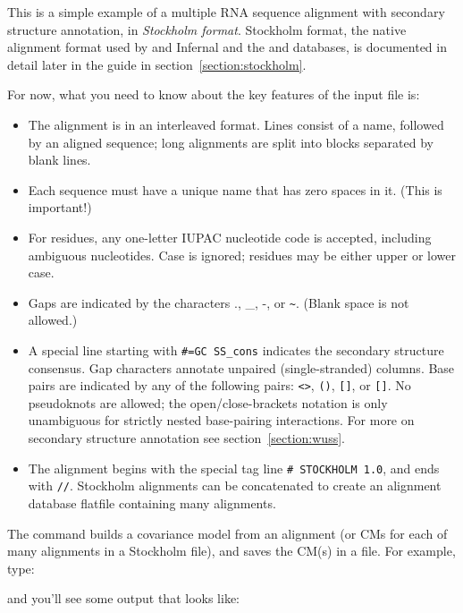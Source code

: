 This is a simple example of a multiple RNA sequence alignment with
secondary structure annotation, in \emph{Stockholm format}. Stockholm
format, the native alignment format used by  and
Infernal and the  and  databases, is
documented in detail later in the guide in
section~\ref{section:stockholm}.

For now, what you need to know about the key features of the input file is:
\begin{itemize}
\item The alignment is in an interleaved format.
Lines consist of a name, followed by an aligned sequence;
long alignments are split into blocks separated by blank lines.
\item Each sequence must have a unique name that has zero spaces in it. (This is important!)
\item For residues, any one-letter IUPAC nucleotide code is accepted,
      including ambiguous nucleotides. Case is ignored; residues
      may be either upper or lower case.
\item Gaps are indicated by the characters ., \_, -, or \verb+~+.
      (Blank space is not allowed.)
\item A special line starting with {\small\verb+#=GC SS_cons+} indicates
      the secondary structure consensus. Gap characters annotate
      unpaired (single-stranded) columns. Base pairs are indicated
      by any of the following pairs: \verb+<>+, \verb+()+, \verb+[]+,
      or \verb+[]+. No pseudoknots are allowed; the
      open/close-brackets notation is only unambiguous for strictly
      nested base-pairing interactions.
      For more on secondary structure annotation see
      section~\ref{section:wuss}.
\item The alignment begins with the special tag line
      {\small\verb+# STOCKHOLM 1.0+}, and ends with {\small\verb+//+}.
      Stockholm alignments
      can be concatenated to create an alignment database flatfile
      containing many alignments.
\end{itemize}

The  command builds a covariance model from an alignment (or
CMs for each of many alignments in a Stockholm file), and saves the
CM(s) in a file. For example, type:


and you'll see some output that looks like:

